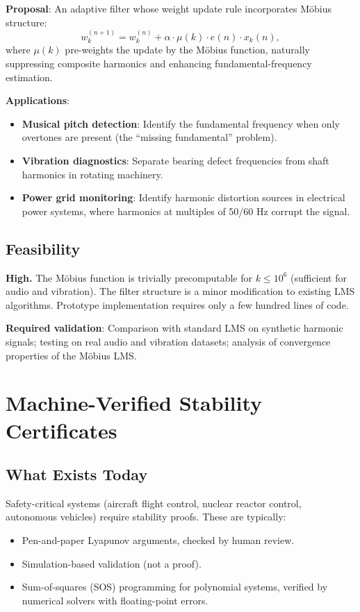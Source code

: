 \documentclass[11pt,a4paper]{article}
\begin{document}
\textbf{Proposal}: An adaptive filter whose weight update rule
incorporates M\"obius structure:
\[
  w_k^{(n+1)} = w_k^{(n)} + \alpha \cdot \mu(k) \cdot e(n) \cdot
  x_k(n),
\]
where $\mu(k)$ pre-weights the update by the M\"obius function,
naturally suppressing composite harmonics and enhancing
fundamental-frequency estimation.

\textbf{Applications}:
\begin{itemize}
  \item \textbf{Musical pitch detection}: Identify the fundamental
    frequency when only overtones are present (the ``missing
    fundamental'' problem).
  \item \textbf{Vibration diagnostics}: Separate bearing defect
    frequencies from shaft harmonics in rotating machinery.
  \item \textbf{Power grid monitoring}: Identify harmonic distortion
    sources in electrical power systems, where harmonics at
    multiples of 50/60 Hz corrupt the signal.
\end{itemize}

\subsection{Feasibility}

\textbf{High.} The M\"obius function is trivially precomputable for
$k \leq 10^6$ (sufficient for audio and vibration). The filter
structure is a minor modification to existing LMS algorithms.
Prototype implementation requires only a few hundred lines of code.

\textbf{Required validation}: Comparison with standard LMS on
synthetic harmonic signals; testing on real audio and vibration
datasets; analysis of convergence properties of the M\"obius LMS.

\section{Machine-Verified Stability Certificates}
\label{sec:lyapunov}

\subsection{What Exists Today}

Safety-critical systems (aircraft flight control, nuclear reactor
control, autonomous vehicles) require stability proofs. These are
typically:
\begin{itemize}
  \item Pen-and-paper Lyapunov arguments, checked by human review.
  \item Simulation-based validation (not a proof).
  \item Sum-of-squares (SOS) programming for polynomial systems,
    verified by numerical solvers with floating-point errors.
\end{itemize}
\end{document}
